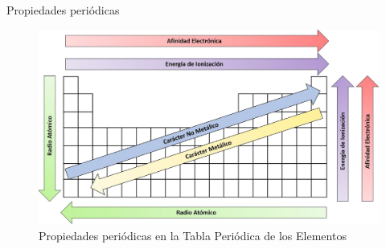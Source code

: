 \begin{infocard}{Propiedades periódicas}
    \begin{figure}[H]
        \includegraphics[width=\linewidth]{../images/prop_periodicas}
        \caption{Propiedades periódicas en la Tabla Periódica de los Elementos}
        \label{fig:prop_periodicas}
    \end{figure}
\end{infocard}